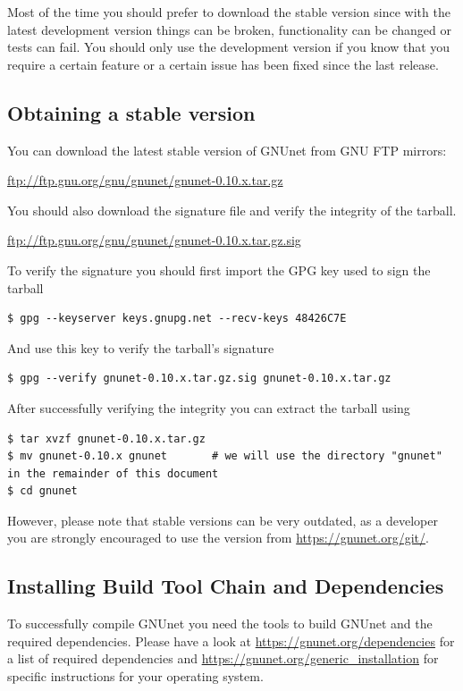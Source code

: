 \documentclass[10pt]{article}
\begin{document}
Most of the time you should prefer to download the stable version since with the
latest development version things can be broken, functionality can be changed or tests
can fail. You should only use the development version if you know that you require a
certain feature or a certain issue has been fixed since the last release.

\subsection{Obtaining a stable version}

You can download the latest stable version of GNUnet from GNU FTP mirrors:
\begin{center}
\url{ftp://ftp.gnu.org/gnu/gnunet/gnunet-0.10.x.tar.gz}
\end{center}
You should also download the signature file and verify the integrity of the tarball.
\begin{center}
\url{ftp://ftp.gnu.org/gnu/gnunet/gnunet-0.10.x.tar.gz.sig}
\end{center}
To verify the signature you should first import the GPG key used to sign the tarball
\lstset{language=bash}
\begin{lstlisting}
$ gpg --keyserver keys.gnupg.net --recv-keys 48426C7E
\end{lstlisting}
And use this key to verify the tarball's signature
\lstset{language=bash}
\begin{lstlisting}
$ gpg --verify gnunet-0.10.x.tar.gz.sig gnunet-0.10.x.tar.gz
\end{lstlisting}
After successfully verifying the integrity you can extract the tarball using
\lstset{language=bash}
\begin{lstlisting}
$ tar xvzf gnunet-0.10.x.tar.gz
$ mv gnunet-0.10.x gnunet		# we will use the directory "gnunet" in the remainder of this document
$ cd gnunet
\end{lstlisting}

However, please note that stable versions can be very outdated, as a developer
you are strongly encouraged to use the version from \url{https://gnunet.org/git/}.

\subsection{Installing Build Tool Chain and Dependencies}

To successfully compile GNUnet you need the tools to build GNUnet and the required dependencies.
Please have a look at \url{https://gnunet.org/dependencies} for a list of required dependencies
and \url{https://gnunet.org/generic_installation} for specific instructions for your operating system.
\end{document}
